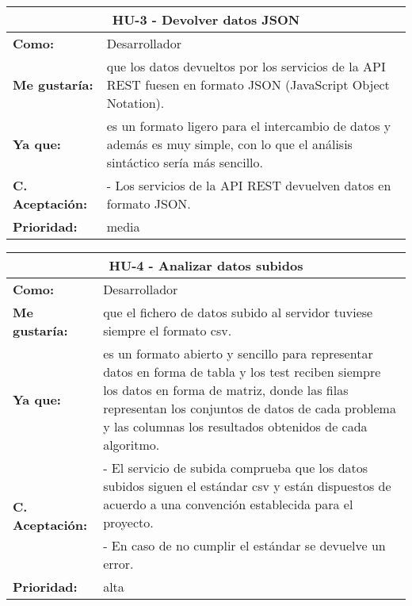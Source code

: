 
\begin{table}[H]
	\begin{tabular}{| p{3cm}| p{11cm} |}
		\hline
		\multicolumn{2}{|c|}{\textbf{HU-3} - Devolver datos JSON} \\ \hline
		\textbf{Como:} & Desarrollador \\ \hline
		\textbf{Me gustaría:} & que los datos devueltos por los servicios de la API REST fuesen en formato JSON (JavaScript Object Notation). \\ \hline
		\textbf{Ya que:} & es un formato ligero para el intercambio de datos y además es muy simple, con lo que el análisis sintáctico sería más sencillo. \\ \hline
		\textbf{C. Aceptación:} & - Los servicios de la API REST devuelven datos en formato JSON. \\ \hline
		\textbf{\textbf{Prioridad:}} & media \\ \hline
	\end{tabular}
\end{table}


\begin{table}[H]
	\begin{tabular}{| p{3cm}| p{11cm} |}
		\hline
		\multicolumn{2}{|c|}{\textbf{HU-4} - Analizar datos subidos} \\ \hline
		\textbf{Como:} & Desarrollador \\ \hline
		\textbf{Me gustaría:} & que el fichero de datos subido al servidor tuviese siempre el formato csv. \\ \hline
		\textbf{Ya que:} & es un formato abierto y sencillo para representar datos en forma de tabla y los test reciben siempre los datos en forma de matriz, donde las filas representan los conjuntos de datos de cada problema y las columnas los resultados obtenidos de cada algoritmo. \\ \hline
		\multirow{2}{11cm}{\textbf{C. Aceptación:}} & - El servicio de subida comprueba que los datos subidos siguen el estándar csv y están dispuestos de acuerdo a una convención establecida para el proyecto. \\
		& - En caso de no cumplir el estándar se devuelve un error. \\ \hline 
		\textbf{\textbf{Prioridad:}} & alta \\ \hline
	\end{tabular}
\end{table}
	
